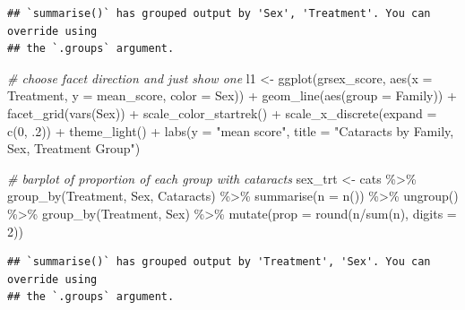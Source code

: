 \documentclass[
]{article}
\newenvironment{Shaded}{\begin{snugshade}}{\end{snugshade}}
\newcommand{\AttributeTok}[1]{\textcolor[rgb]{0.77,0.63,0.00}{#1}}
\newcommand{\CommentTok}[1]{\textcolor[rgb]{0.56,0.35,0.01}{\textit{#1}}}
\newcommand{\DecValTok}[1]{\textcolor[rgb]{0.00,0.00,0.81}{#1}}
\newcommand{\FunctionTok}[1]{\textcolor[rgb]{0.00,0.00,0.00}{#1}}
\newcommand{\NormalTok}[1]{#1}
\newcommand{\OtherTok}[1]{\textcolor[rgb]{0.56,0.35,0.01}{#1}}
\newcommand{\SpecialCharTok}[1]{\textcolor[rgb]{0.00,0.00,0.00}{#1}}
\newcommand{\StringTok}[1]{\textcolor[rgb]{0.31,0.60,0.02}{#1}}
\begin{document}
\begin{verbatim}
## `summarise()` has grouped output by 'Sex', 'Treatment'. You can override using
## the `.groups` argument.
\end{verbatim}

\begin{Shaded}
\begin{Highlighting}[]
\CommentTok{\# choose facet direction and just show one}
\NormalTok{l1 }\OtherTok{\textless{}{-}} \FunctionTok{ggplot}\NormalTok{(grsex\_score, }\FunctionTok{aes}\NormalTok{(}\AttributeTok{x =}\NormalTok{ Treatment, }\AttributeTok{y =}\NormalTok{ mean\_score, }\AttributeTok{color =}\NormalTok{ Sex)) }\SpecialCharTok{+}
  \FunctionTok{geom\_line}\NormalTok{(}\FunctionTok{aes}\NormalTok{(}\AttributeTok{group =}\NormalTok{ Family)) }\SpecialCharTok{+} \FunctionTok{facet\_grid}\NormalTok{(}\FunctionTok{vars}\NormalTok{(Sex)) }\SpecialCharTok{+}
  \FunctionTok{scale\_color\_startrek}\NormalTok{() }\SpecialCharTok{+}
  \FunctionTok{scale\_x\_discrete}\NormalTok{(}\AttributeTok{expand =} \FunctionTok{c}\NormalTok{(}\DecValTok{0}\NormalTok{, .}\DecValTok{2}\NormalTok{)) }\SpecialCharTok{+}
  \FunctionTok{theme\_light}\NormalTok{() }\SpecialCharTok{+}
  \FunctionTok{labs}\NormalTok{(}\AttributeTok{y =} \StringTok{"mean score"}\NormalTok{,}
       \AttributeTok{title =} \StringTok{"Cataracts by Family, Sex, Treatment Group"}\NormalTok{)}
\end{Highlighting}
\end{Shaded}

\begin{Shaded}
\begin{Highlighting}[]
\CommentTok{\# barplot of proportion of each group with cataracts}
\NormalTok{sex\_trt }\OtherTok{\textless{}{-}}\NormalTok{ cats }\SpecialCharTok{\%\textgreater{}\%}
  \FunctionTok{group\_by}\NormalTok{(Treatment, Sex, Cataracts) }\SpecialCharTok{\%\textgreater{}\%}
  \FunctionTok{summarise}\NormalTok{(}\AttributeTok{n =} \FunctionTok{n}\NormalTok{()) }\SpecialCharTok{\%\textgreater{}\%}
  \FunctionTok{ungroup}\NormalTok{() }\SpecialCharTok{\%\textgreater{}\%}
  \FunctionTok{group\_by}\NormalTok{(Treatment, Sex) }\SpecialCharTok{\%\textgreater{}\%}
  \FunctionTok{mutate}\NormalTok{(}\AttributeTok{prop =} \FunctionTok{round}\NormalTok{(n}\SpecialCharTok{/}\FunctionTok{sum}\NormalTok{(n), }\AttributeTok{digits =} \DecValTok{2}\NormalTok{))}
\end{Highlighting}
\end{Shaded}

\begin{verbatim}
## `summarise()` has grouped output by 'Treatment', 'Sex'. You can override using
## the `.groups` argument.
\end{verbatim}
\end{document}
